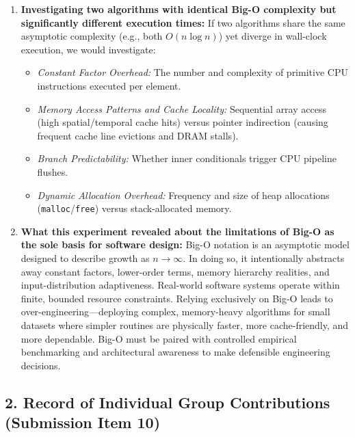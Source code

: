 \documentclass[11pt]{article}
\begin{document}
\begin{enumerate}[resume, itemsep=0.15em, topsep=0.1em]
    \item \textbf{Investigating two algorithms with identical Big-O complexity but significantly different execution times:}
    If two algorithms share the same asymptotic complexity (e.g., both $O(n \log n)$) yet diverge in wall-clock execution, we would investigate:
    \begin{itemize}[itemsep=0.03em, topsep=0.05em]
        \item \textit{Constant Factor Overhead:} The number and complexity of primitive CPU instructions executed per element.
        \item \textit{Memory Access Patterns and Cache Locality:} Sequential array access (high spatial/temporal cache hits) versus pointer indirection (causing frequent cache line evictions and DRAM stalls).
        \item \textit{Branch Predictability:} Whether inner conditionals trigger CPU pipeline flushes.
        \item \textit{Dynamic Allocation Overhead:} Frequency and size of heap allocations (\texttt{malloc}/\texttt{free}) versus stack-allocated memory.
    \end{itemize}

    \item \textbf{What this experiment revealed about the limitations of Big-O as the sole basis for software design:}
    Big-O notation is an asymptotic model designed to describe growth as $n \to \infty$. In doing so, it intentionally abstracts away constant factors, lower-order terms, memory hierarchy realities, and input-distribution adaptiveness. Real-world software systems operate within finite, bounded resource constraints. Relying exclusively on Big-O leads to over-engineering---deploying complex, memory-heavy algorithms for small datasets where simpler routines are physically faster, more cache-friendly, and more dependable. Big-O must be paired with controlled empirical benchmarking and architectural awareness to make defensible engineering decisions.
\end{enumerate}

\subsection*{2. Record of Individual Group Contributions (Submission Item 10)}
\end{document}
